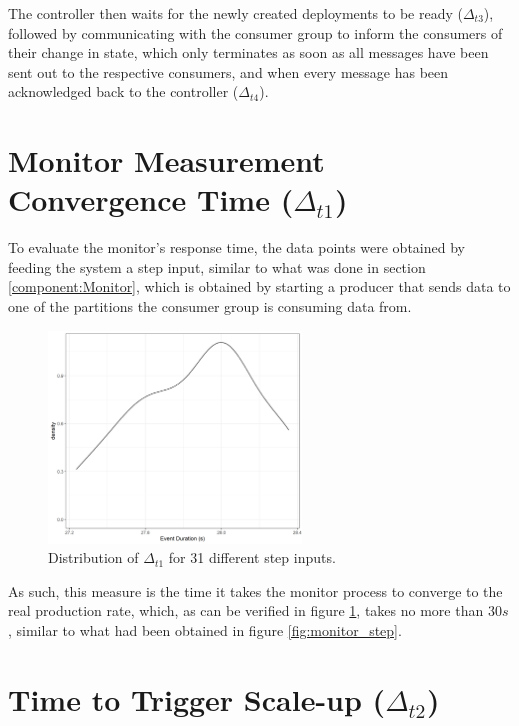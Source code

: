 The controller then waits for the newly created deployments to be ready
($\Delta_{t3}$), followed by communicating with the consumer group to inform the
consumers of their change in state, which only terminates as
soon as all messages have been sent out to the respective consumers, and when every message
has been acknowledged back to the controller ($\Delta_{t4}$).

\section{Monitor Measurement Convergence Time ($\Delta_{t1}$)}
\label{c3sec:MonitorMeasurement}

To evaluate the monitor's response time, the data points were obtained by
feeding the system a step input, similar to what was done in section
\ref{component:Monitor}, which is obtained by starting a producer that sends
data to one of the partitions the consumer group is consuming data from.

\begin{figure}[H]
\centering
\includegraphics[width=0.6\textwidth]{images/integration/delta1.png}
\caption{
    Distribution of $\Delta_{t1}$ for 31 different step inputs.
}
\label{fig:controller_result_monitor}
\end{figure}

As such, this measure is the time it takes the monitor process to converge to
the real production rate, which, as can be verified in figure
\ref{fig:controller_result_monitor}, takes no more than $30s$, similar to what
had been obtained in figure \ref{fig:monitor_step}.

\section{Time to Trigger Scale-up ($\Delta_{t2}$)}

